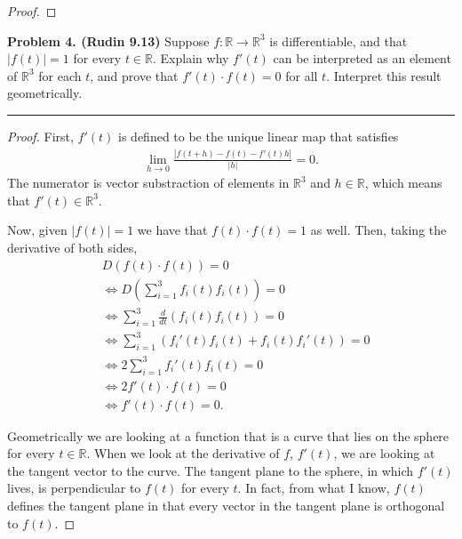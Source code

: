 \documentclass[leqno]{article}
\theoremstyle{nonumberplain}
\newtheorem{proof}{Proof}
\newcommand{\R}{\mathbb{R}}
\begin{document}
\begin{proof}
\end{proof}
\pagebreak





\noindent\textbf{Problem 4. (Rudin 9.13)} Suppose $f\colon \R \to \R^3$ is differentiable, and that $|f(t)|=1$ for every $t\in \R$. Explain why $f'(t)$ can be interpreted as an element of $\R^3$ for each $t$, and prove that $f'(t)\cdot f(t)=0$ for all $t$. Interpret this result geometrically.

\noindent\rule[0.5ex]{\linewidth}{1pt}

\begin{proof}
First, $f'(t)$ is defined to be the unique linear map that satisfies
\begin{align*}
\lim_{h\to 0} \frac{|f(t+h)-f(t)-f'(t)h|}{|h|}=0.
\end{align*}
The numerator is vector substraction of elements in $\R^3$ and $h\in \R$, which means that $f'(t)\in \R^3$.  

Now, given $|f(t)|=1$ we have that $f(t)\cdot f(t)=1$ as well.  Then, taking the derivative of both sides,
\begin{align*}
&D(f(t)\cdot f(t))= 0\\
&\iff D\left( \sum_{i=1}^3 f_i(t)f_i(t)\right)=0\\
&\iff \sum_{i=1}^3 \frac{d}{dt} (f_i(t)f_i(t)) =0\\
&\iff \sum_{i=1}^3 (f_i'(t)f_i(t)+f_i(t)f_i'(t))=0\\
&\iff 2 \sum_{i=1}^3 f_i'(t)f_i(t) =0\\
&\iff 2 f'(t)\cdot f(t)=0\\
&\iff f'(t)\cdot f(t) =0.
\end{align*}

Geometrically we are looking at a function that is a curve that lies on the sphere for every $t\in \R$.  When we look at the derivative of $f$, $f'(t)$, we are looking at the tangent vector to the curve.  The tangent plane to the sphere, in which $f'(t)$ lives, is perpendicular to $f(t)$ for every $t$.  In fact, from what I know, $f(t)$ defines the tangent plane in that every vector in the tangent plane is orthogonal to $f(t)$.
\end{proof}


\pagebreak
\end{document}
